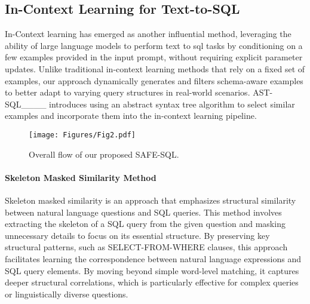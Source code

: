 \subsection{In-Context Learning for Text-to-SQL}
In-Context learning has emerged as another influential method, leveraging the ability of large language models to perform text to sql tasks by conditioning on a few examples provided in the input prompt, without requiring explicit parameter updates. 
Unlike traditional in-context learning methods that rely on a fixed set of examples, our approach dynamically generates and filters schema-aware examples to better adapt to varying query structures in real-world scenarios.
AST-SQL____ introduces using an abstract syntax tree algorithm to select similar examples and incorporate them into the in-context learning pipeline. 

\begin{figure*}[!ht]
\centerline{\texttt{[image: Figures/Fig2.pdf]}}
\caption{Overall flow of our proposed SAFE-SQL.}
\vspace{-4mm}
\label{fig:main}
\end{figure*}

\paragraph{Skeleton Masked Similarity Method}
Skeleton masked similarity is an approach that emphasizes structural similarity between natural language questions and SQL queries. This method involves extracting the skeleton of a SQL query from the given question and masking unnecessary details to focus on its essential structure.
By preserving key structural patterns, such as SELECT-FROM-WHERE clauses, this approach facilitates learning the correspondence between natural language expressions and SQL query elements. 
By moving beyond simple word-level matching, it captures deeper structural correlations, which is particularly effective for complex queries or linguistically diverse questions.


